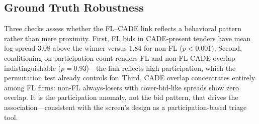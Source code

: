 
\subsection{Ground Truth Robustness}
\label{sec:ground_truth}

Three checks assess whether the FL--CADE link reflects a behavioral
pattern rather than mere proximity. First, FL bids in CADE-present tenders have mean
log-spread 3.08 above the winner versus 1.84 for non-FL ($p < 0.001$).
Second, conditioning on participation count renders FL and non-FL
CADE overlap indistinguishable ($p = 0.93$)---the link reflects high
participation, which the permutation test already controls for.
Third, CADE overlap concentrates entirely among FL firms: non-FL
always-losers with cover-bid-like spreads show zero overlap. It is the participation anomaly, not the bid pattern, that drives
the association---consistent with the screen's design as a
participation-based triage tool.
